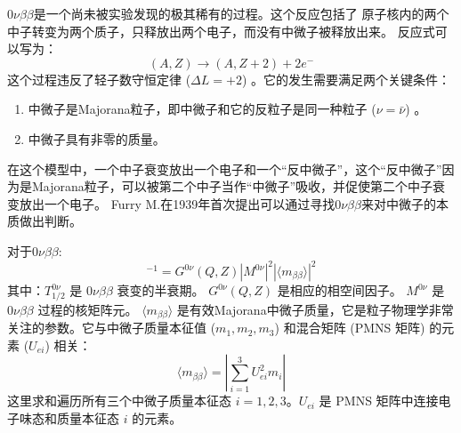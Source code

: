 $0\nu\beta\beta$是一个尚未被实验发现的极其稀有的过程。这个反应包括了
    原子核内的两个中子转变为两个质子，只释放出两个电子，而没有中微子被释放出来。
    反应式可以写为：
    \begin{equation}
         (A, Z)  \rightarrow  (A, Z+2)  + 2e^{-}
    \end{equation}
    这个过程违反了轻子数守恒定律  ($\Delta L = +2$) 。它的发生需要满足两个关键条件：
    \begin{enumerate}
        \item 中微子是Majorana粒子，即中微子和它的反粒子是同一种粒子  ($\nu = \bar{\nu}$) 。
        \item 中微子具有非零的质量。
    \end{enumerate}
    在这个模型中，一个中子衰变放出一个电子和一个“反中微子”，这个“反中微子”因为是Majorana粒子，可以被第二个中子当作“中微子”吸收，并促使第二个中子衰变放出一个电子。
    Furry M.在1939年首次提出可以通过寻找$0\nu\beta\beta$来对中微子的本质做出判断。\cite{PhysRev.56.1184}

    对于$0\nu\beta\beta$:
    \begin{equation}
        [ T^{0\nu}_{1/2} ]^{-1} = G^{0\nu} (Q, Z)  | M^{0\nu} |^2 | \langle m_{\beta\beta} \rangle |^2
        \label{eq:0nubb_halflife}
    \end{equation}
    其中：$T^{0\nu}_{1/2}$ 是 $0\nu\beta\beta$ 衰变的半衰期。
$G^{0\nu} (Q, Z) $ 是相应的相空间因子。
$M^{0\nu}$ 是 $0\nu\beta\beta$ 过程的核矩阵元。
$\langle m_{\beta\beta} \rangle$ 是有效Majorana中微子质量，它是粒子物理学非常关注的参数。它与中微子质量本征值  ($m_1, m_2, m_3$)  和混合矩阵 (PMNS 矩阵) 的元素  ($U_{ei}$)  相关：
        \begin{equation}
            \langle m_{\beta\beta} \rangle = \left| \sum_{i=1}^{3} U^2_{ei} m_i \right|
            \label{eq:mbb}
        \end{equation}
        这里求和遍历所有三个中微子质量本征态 $i=1, 2, 3$。$U_{ei}$ 是 PMNS 矩阵中连接电子味态和质量本征态 $i$ 的元素。



